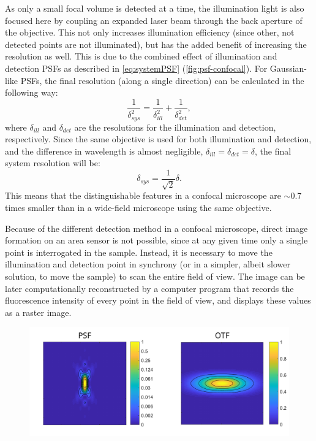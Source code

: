     As only a small focal volume is detected at a time, the illumination light is also focused here by coupling an expanded laser beam through the back aperture of the objective. This not only increases illumination efficiency (since other, not detected points are not illuminated), but has the added benefit of increasing the resolution as well. This is due to the combined effect of illumination and detection PSFs as described in \autoref{eq:systemPSF} (\autoref{fig:psf-confocal}). For Gaussian-like PSFs, the final resolution (along a single direction) can be calculated in the following way:
    \begin{equation}
      \frac{1}{\delta _{sys}^2} = \frac{1}{\delta _{ill}^2} + \frac{1}{\delta _{det}^2},
      \label{eq:systemRes}
    \end{equation}
    where $\delta_{ill}$ and $\delta_{det}$ are the resolutions for the illumination and detection, respectively. Since the same objective is used for both illumination and detection, and the difference in wavelength is almost negligible, $\delta_{ill} = \delta_{det} = \delta$, the final system resolution will be:
    \begin{equation}
      \delta_{sys} = \frac{1}{\sqrt{2}} \delta.
    \end{equation}
    This means that the distinguishable features in a confocal microscope are $\sim$0.7 times smaller than in a wide-field microscope using the same objective.

    Because of the different detection method in a confocal microscope, direct image formation on an area sensor is not possible, since at any given time only a single point is interrogated in the sample. Instead, it is necessary to move the illumination and detection point in synchrony (or in a simpler, albeit slower solution, to move the sample) to scan the entire field of view. The image can be later computationally reconstructed by a computer program that records the fluorescence intensity of every point in the field of view, and displays these values as a raster image.


    \begin{figure}
      \centering
      \includegraphics[width=1\textwidth]{psfs/confocal.pdf}
      \label{fig:psf-confocal}
    \end{figure}


